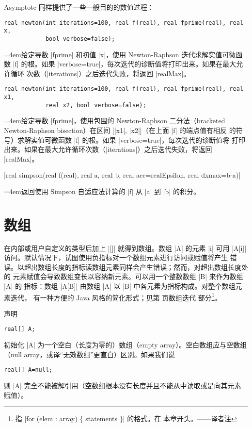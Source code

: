 \documentclass{ctexbook}
\newenvironment{funclist}{\trivlist
  \parindent=0pt
\item[]
  \def\item{\medskip\par\leftskip=0pt}
  \def\go{\par\leftskip=4em}}
{\endtrivlist}
\newcommand*\prgname[1]{\textsf{#1}}
\newcommand\transnote[1]{\footnote{#1——译者注}}
\begin{document}
{{{\prgname{Asymptote} 同样提供了一些一般目的的数值过程：
\begin{funclist}
\item 
\begin{lstlisting}[style=funclist]
real newton(int iterations=100, real f(real), real fprime(real), real x,
            bool verbose=false);
\end{lstlisting}
\go 给定导数 |fprime| 和初值 |x|，使用 Newton-Raphson 迭代求解实值可微函数
|f| 的根。如果 |verbose=true|，每次迭代的诊断值将打印出来。如果在最大允许循环
次数（|iterations|）之后迭代失败，将返回 |realMax|。

\item
\begin{lstlisting}[style=funclist]
real newton(int iterations=100, real f(real), real fprime(real), real x1,
            real x2, bool verbose=false);
\end{lstlisting}
\go 给定导数 |fprime|，使用包围的 Newton-Raphson 二分法（bracketed
Newton-Raphson bisection）在区间 $[$|x1|, |x2|$]$（在上面 |f| 的端点值有相反
的符号）求解实值可微函数 |f| 的根。如果 |verbose=true|，每次迭代的诊断值将
打印出来。如果在最大允许循环次数（|iterations|）之后迭代失败，将返回
|realMax|。

\item
|real simpson(real f(real), real a, real b, real acc=realEpsilon, real dxmax=b-a)|
\go 返回使用 Simpson 自适应法计算的 |f| 从 |a| 到 |b| 的积分。
\end{funclist}



\section{数组}
\label{sec:arrays}

在内部或用户自定义的类型后加上 |[]| 就得到数组。数组 |A| 的元素 |i| 可用
|A[i]| 访问。默认情况下，试图使用负指标对一个数组元素进行访问或赋值将产生
错误。以超出数组长度的指标读数组元素同样会产生错误；然而，对超出数组长度处的
元素赋值会导致数组变长以容纳新元素。可以用一个整数数组 |B| 来作为数组 |A| 的
指标：数组 |A[B]| 由数组 |A| 以 |B| 中各元素为指标构成。对整个数组元素迭代，
有一种方便的 Java 风格的简化形式；见第 \pageref{chap:programming} 页数组迭代
部分\transnote{指 \inlinecode|for (elem : array) \{ statements \}| 的格式。在
本章开头。}。

声明
\begin{lstlisting}
real[] A;
\end{lstlisting}
初始化 |A| 为一个空白（长度为零的）数组（empty array）。空白数组应与空数组
（null array，或译“无效数组”更直白）区别。如果我们说
\begin{lstlisting}
real[] A=null;
\end{lstlisting}
则 |A| 完全不能被解引用（空数组根本没有长度并且不能从中读取或是向其元素
赋值）。

}}}
\end{document}
